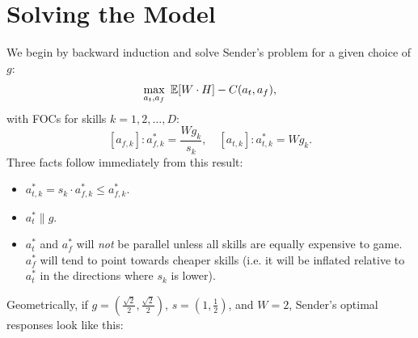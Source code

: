 \section{Solving the Model}
\label{sec:solving-the-model}

We begin by backward induction and solve Sender's problem for a given choice of $g$: $$\max_{a_t,a_f} \ \mathbb{E}[W \cdot H]-C(a_t,a_f),$$ with FOCs for skills $k=1,2,\dots,D$: $$[a_{f,k}]:a_{f,k}^*=\dfrac{Wg_k}{s_k}, \quad [a_{t,k}]:a_{t,k}^*=Wg_k.$$ Three facts follow immediately from this result:
\begin{itemize}[nosep]
    \item $a_{t,k}^* =s_k \cdot a_{f,k}^* \leq a_{f,k}^*$.
    \item $a_t^* \parallel g$.
    \item $a_t^*$ and $a_f^*$ will \textit{not} be parallel unless all skills are equally expensive to game. $a_f^*$ will tend to point towards cheaper skills (i.e. it will be inflated relative to $a_t^*$ in the directions where $s_k$ is lower).\\
\end{itemize}

\noindent Geometrically, if $g=(\tfrac{\sqrt 2}2,\tfrac{\sqrt 2}2)$, $s=(1, \tfrac 1 2)$, and $W=2$, Sender's optimal responses look like this:

\begin{center}
\end{center}

